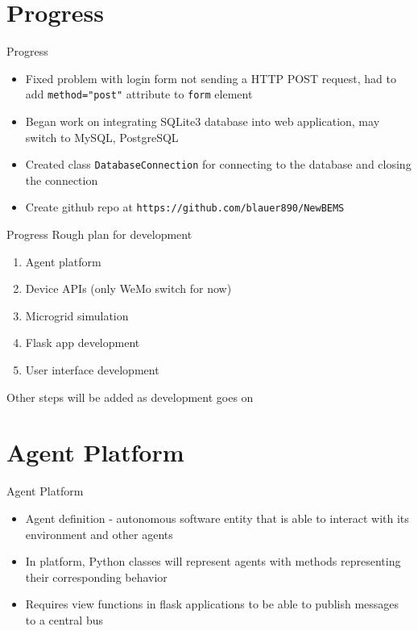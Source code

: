 \documentclass{beamer}
\begin{document}
\section{Progress}
\begin{frame}{Progress}
\begin{itemize}
\item Fixed problem with login form not sending a HTTP POST request, had to add \texttt{method="post"} attribute to \texttt{form} element
\item Began work on integrating SQLite3 database into web application, may switch to MySQL, PostgreSQL
\item Created class \texttt{DatabaseConnection} for connecting to the database and closing the connection 
\item Create github repo at \texttt{https://github.com/blauer890/NewBEMS}
\end{itemize}
\end{frame}

\begin{frame}{Progress}
Rough plan for development
\begin{enumerate}
\item Agent platform
\item Device APIs (only WeMo switch for now)
\item Microgrid simulation
\item Flask app development
\item User interface development
\end{enumerate}
Other steps will be added as development goes on
\end{frame}

\section{Agent Platform}
\begin{frame}{Agent Platform}
\begin{itemize}
\item Agent definition - autonomous software entity that is able to interact with its environment and other agents
\item In platform, Python classes will represent agents with methods representing their corresponding behavior
\item Requires view functions in flask applications to be able to publish messages to a central bus
\end{itemize}
\end{frame}
\end{document}
